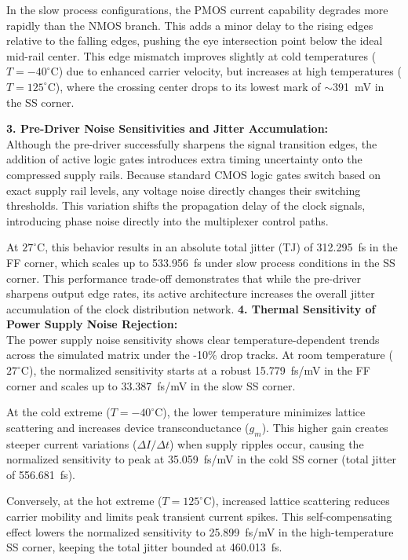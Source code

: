 In the slow process configurations, the PMOS current capability degrades more rapidly than the NMOS branch. This adds a minor delay to the rising edges relative to the falling edges, pushing the eye intersection point below the ideal mid-rail center. This edge mismatch improves slightly at cold temperatures ($T = -40^{\circ}\text{C}$) due to enhanced carrier velocity, but increases at high temperatures ($T = 125^{\circ}\text{C}$), where the crossing center drops to its lowest mark of $\sim$391~mV in the SS corner.

\textbf{3. Pre-Driver Noise Sensitivities and Jitter Accumulation:} \\
Although the pre-driver successfully sharpens the signal transition edges, the addition of active logic gates introduces extra timing uncertainty onto the compressed supply rails. Because standard CMOS logic gates switch based on exact supply rail levels, any voltage noise directly changes their switching thresholds. This variation shifts the propagation delay of the clock signals, introducing phase noise directly into the multiplexer control paths. 

At $27^{\circ}\text{C}$, this behavior results in an absolute total jitter (TJ) of 312.295~fs in the FF corner, which scales up to 533.956~fs under slow process conditions in the SS corner. This performance trade-off demonstrates that while the pre-driver sharpens output edge rates, its active architecture increases the overall jitter accumulation of the clock distribution network.
\clearpage
\textbf{4. Thermal Sensitivity of Power Supply Noise Rejection:} \\
The power supply noise sensitivity shows clear temperature-dependent trends across the simulated matrix under the -10\% drop tracks. At room temperature ($27^{\circ}\text{C}$), the normalized sensitivity starts at a robust 15.779~fs/mV in the FF corner and scales up to 33.387~fs/mV in the slow SS corner. 

At the cold extreme ($T = -40^{\circ}\text{C}$), the lower temperature minimizes lattice scattering and increases device transconductance ($g_m$). This higher gain creates steeper current variations ($\Delta I/\Delta t$) when supply ripples occur, causing the normalized sensitivity to peak at 35.059~fs/mV in the cold SS corner (total jitter of 556.681~fs). 

Conversely, at the hot extreme ($T = 125^{\circ}\text{C}$), increased lattice scattering reduces carrier mobility and limits peak transient current spikes. This self-compensating effect lowers the normalized sensitivity to 25.899~fs/mV in the high-temperature SS corner, keeping the total jitter bounded at 460.013~fs. 

